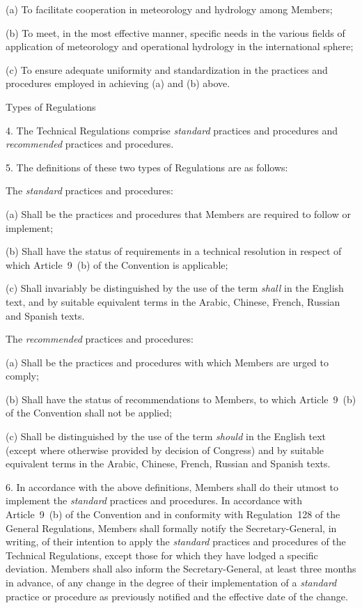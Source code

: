 (a) To facilitate cooperation in meteorology and hydrology among Members;

(b) To meet, in the most effective manner, specific needs in the various fields of application of meteorology and operational hydrology in the international sphere;

(c) To ensure adequate uniformity and standardization in the practices and procedures employed in achieving (a) and (b) above.

Types of Regulations

4. The Technical Regulations comprise \emph{standard} practices and procedures and \emph{recommended} practices and procedures.

5. The definitions of these two types of Regulations are as follows:

The \emph{standard} practices and procedures:

(a) Shall be the practices and procedures that Members are required to follow or implement;

(b) Shall have the status of requirements in a technical resolution in respect of which Article~9~(b) of the Convention is applicable;

(c) Shall invariably be distinguished by the use of the term \emph{shall} in the English text, and by suitable equivalent terms in the Arabic, Chinese, French, Russian and Spanish texts.

The \emph{recommended} practices and procedures:

(a) Shall be the practices and procedures with which Members are urged to comply;

(b) Shall have the status of recommendations to Members, to which Article~9~(b) of the Convention shall not be applied;

(c) Shall be distinguished by the use of the term \emph{should} in the English text (except where otherwise provided by decision of Congress) and by suitable equivalent terms in the Arabic, Chinese, French, Russian and Spanish texts.

6. In accordance with the above definitions, Members shall do their utmost to implement the \emph{standard} practices and procedures. In accordance with Article~9~(b) of the Convention and in conformity with Regulation~128 of the General Regulations, Members shall formally notify the Secretary-General, in writing, of their intention to apply the \emph{standard} practices and procedures of the Technical Regulations, except those for which they have lodged a specific deviation. Members shall also inform the Secretary-General, at least three months in advance, of any change in the degree of their implementation of a \emph{standard} practice or procedure as previously notified and the effective date of the change.


